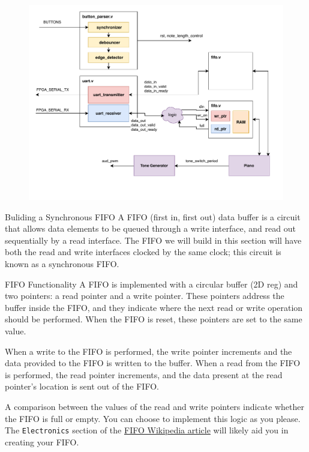 \documentclass[11pt]{article}
\makeatletter
\renewcommand{\section}
{\@startsection {section}{1}{0pt}
 {-2ex}
 {1ex}
 {\bfseries\Large}}
\renewcommand{\subsection}
{\@startsection {subsection}{1}{0pt}
 {-1ex}
 {0.5ex}
 {\bfseries\normalsize}}
\makeatother
\begin{document}
\begin{figure}[H]
    \centerline{\includegraphics[width=\textwidth]{Lab6_Block_Diagram.pdf}}
\end{figure}

\section{Buliding a Synchronous FIFO}
A FIFO (first in, first out) data buffer is a circuit that allows data elements to be queued through a write interface, and read out sequentially by a read interface.
The FIFO we will build in this section will have both the read and write interfaces clocked by the same clock; this circuit is known as a synchronous FIFO.

\subsection{FIFO Functionality}
A FIFO is implemented with a circular buffer (2D reg) and two pointers: a read pointer and a write pointer.
These pointers address the buffer inside the FIFO, and they indicate where the next read or write operation should be performed.
When the FIFO is reset, these pointers are set to the same value.

When a write to the FIFO is performed, the write pointer increments and the data provided to the FIFO is written to the buffer.
When a read from the FIFO is performed, the read pointer increments, and the data present at the read pointer's location is sent out of the FIFO.

A comparison between the values of the read and write pointers indicate whether the FIFO is full or empty.
You can choose to implement this logic as you please.
The \verb|Electronics| section of the \href{https://en.wikipedia.org/wiki/FIFO_(computing_and_electronics)}{FIFO Wikipedia article} will likely aid you in creating your FIFO.
\end{document}

